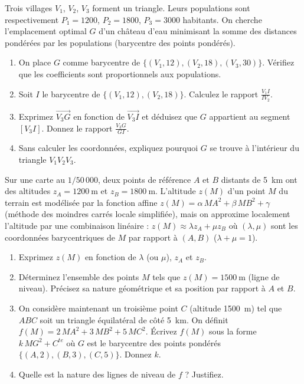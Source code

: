 \documentclass[11pt]{article}
\begin{document}
\begin{exercice}
Trois villages $V_1$, $V_2$, $V_3$ forment un triangle. Leurs populations sont respectivement $P_1 = 1200$, $P_2 = 1800$, $P_3 = 3000$ habitants. On cherche l'emplacement optimal $G$ d'un château d'eau minimisant la somme des distances pondérées par les populations (barycentre des points pondérés).
\begin{enumerate}
    \item On place $G$ comme barycentre de $\{(V_1, 12), (V_2, 18), (V_3, 30)\}$. Vérifiez que les coefficients sont proportionnels aux populations.
    \item Soit $I$ le barycentre de $\{(V_1, 12), (V_2, 18)\}$. Calculez le rapport $\frac{V_1I}{IV_2}$.
    \item Exprimez $\overrightarrow{V_3G}$ en fonction de $\overrightarrow{V_3I}$ et déduisez que $G$ appartient au segment $[V_3I]$. Donnez le rapport $\frac{V_3G}{GI}$.
    \item Sans calculer les coordonnées, expliquez pourquoi $G$ se trouve à l'intérieur du triangle $V_1V_2V_3$.
\end{enumerate}
\end{exercice}

\begin{exercice}
Sur une carte au $1/50\,000$, deux points de référence $A$ et $B$ distants de \SI{5}{\kilo\meter} ont des altitudes $z_A = \SI{1200}{\meter}$ et $z_B = \SI{1800}{\meter}$. L'altitude $z(M)$ d'un point $M$ du terrain est modélisée par la fonction affine $z(M) = \alpha \, MA^2 + \beta \, MB^2 + \gamma$ (méthode des moindres carrés locale simplifiée), mais on approxime localement l'altitude par une combinaison linéaire : $z(M) \approx \lambda z_A + \mu z_B$ où $(\lambda, \mu)$ sont les coordonnées barycentriques de $M$ par rapport à $(A,B)$ ($\lambda+\mu=1$).
\begin{enumerate}
    \item Exprimez $z(M)$ en fonction de $\lambda$ (ou $\mu$), $z_A$ et $z_B$.
    \item Déterminez l'ensemble des points $M$ tels que $z(M) = \SI{1500}{\meter}$ (ligne de niveau). Précisez sa nature géométrique et sa position par rapport à $A$ et $B$.
    \item On considère maintenant un troisième point $C$ (altitude \SI{1500}{\meter}) tel que $ABC$ soit un triangle équilatéral de côté \SI{5}{\kilo\meter}. On définit $f(M) = 2\,MA^2 + 3\,MB^2 + 5\,MC^2$. Écrivez $f(M)$ sous la forme $k\,MG^2 + C^{te}$ où $G$ est le barycentre des points pondérés $\{(A,2), (B,3), (C,5)\}$. Donnez $k$.
    \item Quelle est la nature des lignes de niveau de $f$ ? Justifiez.
\end{enumerate}
\end{exercice}
\end{document}
